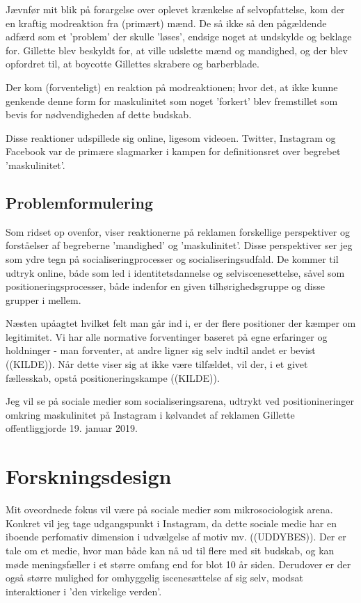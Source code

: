 Jævnfør mit blik på forargelse over oplevet krænkelse af
selvopfattelse, kom der en kraftig modreaktion fra (primært) mænd.
De så ikke så den pågældende adfærd som et 'problem' der skulle
'løses', endsige noget at undskylde og beklage for. Gillette blev
beskyldt for, at ville udslette mænd og mandighed, og der blev
opfordret til, at boycotte Gillettes skrabere og barberblade. 

Der kom (forventeligt) en reaktion på modreaktionen; hvor det, at
ikke kunne genkende denne form for maskulinitet som noget
'forkert' blev fremstillet som bevis for nødvendigheden af dette
budskab. 

Disse reaktioner udspillede sig online, ligesom videoen. Twitter,
Instagram og Facebook var de primære slagmarker i kampen for
definitionsret over begrebet 'maskulinitet'.

\subsection{Problemformulering}

Som ridset op ovenfor, viser reaktionerne på reklamen forskellige
perspektiver og forståelser af begreberne 'mandighed' og
'maskulinitet'. Disse perspektiver ser jeg som ydre tegn på
socialiseringprocesser og socialiseringsudfald. De kommer til
udtryk online, både som led i identitetsdannelse og
selviscenesettelse, såvel som positioneringsprocesser, både
indenfor en given tilhørighedsgruppe og disse grupper i mellem.

Næsten upåagtet hvilket felt man går ind i, er der flere
positioner der kæmper om legitimitet.  Vi har alle normative
forventinger baseret på egne erfaringer og holdninger - man
forventer, at andre ligner sig selv indtil andet er bevist
((KILDE)). Når dette viser sig at ikke være tilfældet, vil der, i
et givet fællesskab, opstå positioneringskampe ((KILDE)). 

Jeg vil se på sociale medier som socialiseringsarena, udtrykt ved
positionineringer omkring maskulinitet på Instagram i kølvandet af
reklamen Gillette offentliggjorde 19. januar 2019.


\section{Forskningsdesign}

Mit oveordnede fokus vil være på sociale medier som
mikrosociologisk arena. Konkret vil jeg tage udgangspunkt i
Instagram, da dette sociale medie har en iboende perfomativ
dimension i udvælgelse af motiv mv.  ((UDDYBES)).  Der er tale om
et medie, hvor man både kan nå ud til flere med sit budskab, og
kan møde meningsfæller i et større omfang end for blot 10 år
siden.  Derudover er der også større mulighed for omhyggelig
iscenesættelse af sig selv, modsat interaktioner i 'den virkelige
verden'.

